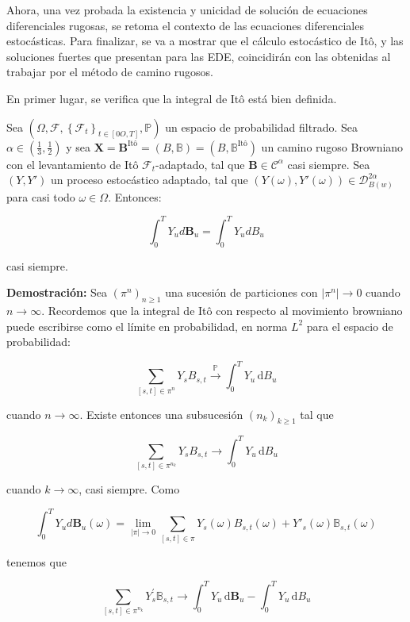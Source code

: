 Ahora, una vez probada la existencia y unicidad de solución de ecuaciones diferenciales rugosas, se retoma el contexto de las ecuaciones diferenciales estocásticas. Para finalizar, se va a mostrar que el cálculo estocástico de Itô, y las soluciones fuertes que presentan para las EDE, coincidirán con las obtenidas al trabajar por el método de camino rugosos.

En primer lugar, se verifica que la integral de Itô está bien definida.


\begin{prop}
	Sea $(\Omega, \mathcal{F}, \left\{ \mathcal{F}_t \right\}_{t \in [0O,T]}, \mathbb{P}  )$ un espacio de probabilidad filtrado. Sea $\alpha \in \left( \frac{1}{3}, \frac{1}{2} \right)$ y sea $\mathbf{X} = \mathbf{B}^{\text{Itô}} = (B, \mathbb{B}) = (B, \mathbb{B}^{\text{Itô}})$ un camino rugoso Browniano con el levantamiento de Itô $\mathcal{F}_t$-adaptado, tal que $\mathbf{B} \in \mathscr{C}^{\alpha}$ casi siempre. Sea $(Y, Y')$ un proceso estocástico adaptado, tal que $(Y(\omega), Y'(\omega)) \in \mathscr{D}^{2\alpha}_{B(w)}$ para casi todo $\omega \in \Omega$. Entonces:

	\[
		\int_0^T Y_u d\mathbf{B}_u = \int_0^T Y_u dB_u
	\]

	casi siempre.
\end{prop}


\textbf{Demostración: } Sea $(\pi^{n})_{n\geq 1}$ una sucesión de particiones con $|\pi^{n}|\to 0$ cuando $n\to\infty$. Recordemos que la integral de Itô con respecto al movimiento browniano puede escribirse como el límite en probabilidad, en norma $L^2$ para el espacio de probabilidad:

\[
\sum_{[s,t]\in\pi^{n}}Y_{s}B_{s,t}\stackrel{\mathbb{P}}{\longrightarrow}\int_{0}^{T}Y_{u}\,\mathrm{d}B_{u}
\]

cuando $n \rightarrow \infty$. Existe entonces una subsucesión $(n_{k})_{k\geq 1}$ tal que

\[
\sum_{[s,t]\in\pi^{n_{k}}}Y_{s}B_{s,t} \to \int_{0}^{T}Y_{u}\,\mathrm{d}B_{u}
\]

cuando $k \rightarrow \infty$, casi siempre. Como

\[
	\int_0^T Y_u d\mathbf{B}_u (\omega) = \lim_{ \lvert \pi \rvert \rightarrow 0 } \sum_{ [s,t] \in \pi } Y_s (\omega) B_{s,t} (\omega) + Y'_s(\omega) \mathbb{B}_{s,t} (\omega)
\]

tenemos que

\[
\sum_{[s,t]\in\pi^{n_{k}}}Y^{\prime}_{s}\mathbb{B}_{s,t} \to \int_{0}^{T}Y_{u}\,\mathrm{d}\mathbf{B}_{u} - \int_{0}^{T}Y_{u}\,\mathrm{d}B_{u} 
\]

